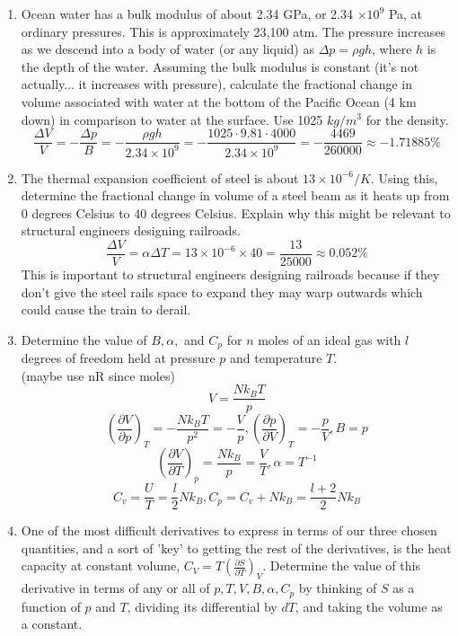 \documentclass{article}
\begin{document}
\begin{enumerate}
\begin{enumerate}
            Also, at this point, the total energy is:
            \[E = \frac{N\varepsilon}{3} + \frac{4N\varepsilon}{3} = \boxed{\frac{5}{3}N\varepsilon}\]
        \end{enumerate}
        \item Ocean water has a bulk modulus of about 2.34 GPa, or 2.34 $\times 10^9$ Pa, at ordinary pressures. This is approximately 23,100 atm. The pressure increases as we descend into a body of water (or any liquid) as $\Delta p = \rho g h$, where $h$ is the depth of the water. Assuming the bulk modulus is constant (it's not actually... it increases with pressure), calculate the fractional change in volume associated with water at the bottom of the Pacific Ocean (4 km down) in comparison to water at the surface. Use 1025 $kg/m^3$ for the density.
        \\
        \[\frac{\Delta V}{V} = -\frac{ \Delta p}{B} = -\frac{\rho g h}{2.34 \times 10^9} =  -\frac{1025 \cdot 9.81 \cdot 4000}{2.34 \times 10^9} = \boxed{-\frac{4469}{260000} \approx -1.71885 \%}\]
        \item The thermal expansion coefficient of steel is about $13 \times 10^{-6} \big/ K$. Using this, determine the fractional change in volume of a steel beam as it heats up from 0 degrees Celsius to 40 degrees Celsius. Explain why this might be relevant to structural engineers designing railroads.
        \\
        \[\frac{\Delta V}{V} = \alpha \Delta T = 13 \times 10^{-6} \times 40 = \boxed{\frac{13}{25000} \approx 0.052 \%}\]
        This is important to structural engineers designing railroads because if they don't give the steel rails space to expand they may warp outwards which could cause the train to derail.
        \item Determine the value of $B, \alpha,$ and $C_p$ for $n$ moles of an ideal gas with $l$ degrees of freedom held at pressure $p$ and temperature $T$.
        \\ (maybe use nR since moles)
        \[V = \frac{Nk_BT}{p}\]
        \[\left( \frac{\partial V}{\partial p}\right)_T = -\frac{Nk_BT}{p^2} = -\frac{V}{p}, \left(\frac{\partial p}{\partial V}\right)_T = -\frac{p}{V}, \boxed{B = p}\]
        \[\left(\frac{\partial V}{\partial T} \right)_p = \frac{Nk_B}{p} = \frac{V}{T}, \boxed{\alpha = T^{-1}}\]
        \[C_v = \frac{U}{T} = \frac{l}{2}Nk_B, \boxed{C_p = C_v + Nk_B = \frac{l+2}{2}Nk_B}\]
        \item One of the most difficult derivatives to express in terms of our three chosen quantities, and a sort of 'key' to getting the rest of the derivatives, is the heat capacity at constant volume, $C_V = T (\frac{\partial S }{\partial T})_V$. Determine the value of this derivative in terms of any or all of $p,T,V,B,\alpha,C_p$ by thinking of $S$ as a function of $p$ and $T$, dividing its differential by $dT$, and taking the volume as a constant.

\end{enumerate}
\end{document}
